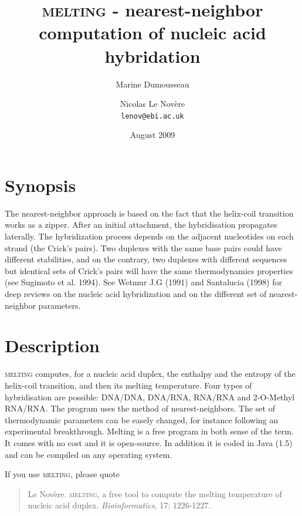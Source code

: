 \documentclass{article}
\begin{document}
\title{\textsc{melting} - nearest-neighbor computation of nucleic acid hybridation}
\author{Marine Dumousseau \and Nicolas Le Nov\`ere \\
  \texttt{lenov@ebi.ac.uk}}
\date{August 2009}
\maketitle

\newpage
\nocite{*}

\section{Synopsis}
The nearest-neighbor approach is based on the fact that the helix-coil
transition works as a zipper. After an initial attachment, the hybridisation
propagates laterally.
The hybridization process depends on the adjacent nucleotides on each strand (the Crick's pairs).  
Two duplexes with the same base pairs could have different stabilities, and on the contrary, two 
duplexes with different sequences but identical sets of Crick's pairs will have the same
thermodynamics properties (see Sugimoto et al. 1994).
See Wetmur J.G (1991) and Santalucia (1998) for deep reviews on the nucleic acid hybridization
and on the different set of nearest-neighbor parameters.
 
\section{Description }

\textsc{melting} computes, for a nucleic acid duplex, the enthalpy and the
entropy of the helix-coil transition, and then its melting temperature. Four
types of hybridisation are possible: DNA/DNA, DNA/RNA, RNA/RNA and 2-O-Methyl RNA/RNA. The program
uses the method of nearest-neighbors. The set of thermodynamic parameters can be
easely changed, for instance following an experimental breakthrough. Melting is
a free program in both sense of the term. It comes with no cost and it is
open-source. In addition it is coded in Java (1.5) and can be compiled on any
operating system.


If you use \textsc{melting}, please quote

\begin{quote}
  Le Nov\`ere. \textsc{melting}, a free tool to compute the
    melting temperature of nucleic acid duplex. \emph{Bioinformatics}, 17: 1226-1227. 
\end{quote}
\end{document}
